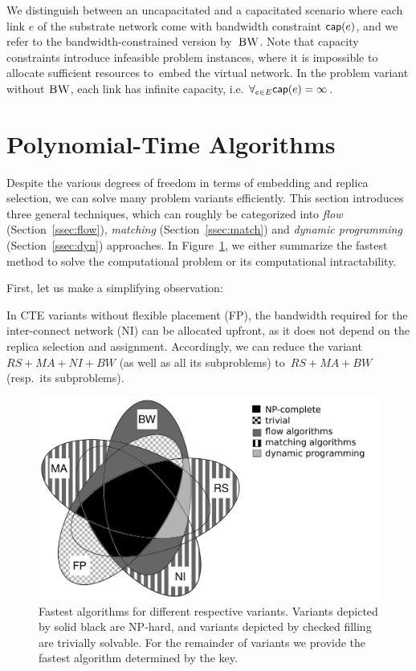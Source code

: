 We distinguish between an uncapacitated and a capacitated scenario where each link $e$
of the substrate network come with bandwidth
constraint $\textsf{cap}(e)$, and we refer to the bandwidth-constrained version by~$\textsc{BW}$.
Note that capacity constraints introduce infeasible problem instances, where it is impossible to
allocate sufficient resources to~embed the virtual network.
In the problem variant without $\textsc{BW}$, each link has infinite capacity, i.e. $\forall_{e\in E} \textsf{cap}(e) = \infty$.

\section{Polynomial-Time Algorithms}\label{sec:poly}


Despite the various degrees of freedom in terms of embedding and replica selection,
we can solve many problem variants efficiently.
 This section introduces three general techniques,
 which can roughly be categorized into
 \emph{flow} (Section~\ref{ssec:flow}), \emph{matching} (Section~\ref{ssec:match}) and \emph{dynamic programming}
 (Section~\ref{ssec:dyn}) approaches.
In Figure~\ref{fig:venn_full}, we either summarize the fastest method to solve the computational problem or its computational intractability.
 
First, let us make a simplifying observation:
\begin{obs}\label{obs:nofp}
In CTE variants without flexible placement (FP),
the bandwidth required
for the inter-connect network (NI) can be allocated upfront, 
as it
does not depend on the replica
selection and assignment.
Accordingly, we can reduce the variant~$RS+MA+NI+BW$ (as well as all its subproblems)
to~$RS+MA+BW$ (resp.~its subproblems).
\end{obs}

\begin{figure}[h]
\centering
\includegraphics[width=0.69\columnwidth]{figs/static-mapping/venn_full2}
\caption{Fastest algorithms for different respective variants. Variants depicted by solid black are NP-hard, and variants depicted by checked filling are trivially solvable. For the remainder of variants we provide the fastest algorithm determined by the key.}
\label{fig:venn_full}
\end{figure}


